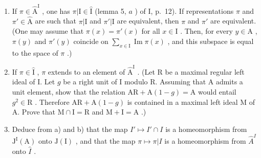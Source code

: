 \begin{enumerate}
\def\labelenumi{\alph{enumi})}
\item
  If \(\pi \in \widehat{\mathrm{A}}^{\mathrm{I}}\) , one has \(\pi | \mathrm{I} \in \widehat{\mathrm{I}}\) (lemma 5, \(a\) ) of I, p.~12). If representations \(\pi\) and \(\pi' \in \widehat{\mathrm{A}}\) are such that \(\pi | \mathrm{I}\) and \(\pi'|\mathrm{I}\) are equivalent, then \(\pi\) and \(\pi'\) are equivalent. (One may assume that \(\pi(x) = \pi'(x)\) for all \(x \in \mathrm{I}\) . Then, for every \(y \in \mathrm{A}\) , \(\pi(y)\) and \(\pi'(y)\) coincide on \(\sum_{x \in \mathrm{I}} \operatorname{Im} \pi(x)\) , and this subspace is equal to the space of \(\pi\) .)
\item
  If \(\pi \in \widehat{\mathrm{I}}\) , \(\pi\) extends to an element of \(\widehat{\mathrm{A}}^{\mathrm{I}}\) . (Let R be a maximal regular left ideal of I. Let \(g\) be a right unit of I modulo R. Assuming that A admits a unit element, show that the relation \(\mathrm{AR} + \mathrm{A}(1 - g) = \mathrm{A}\) would entail \(g^2 \in \mathrm{R}\) . Therefore \(\mathrm{AR} + \mathrm{A}(1 - g)\) is contained in a maximal left ideal M of A. Prove that \(\mathrm{M} \cap \mathrm{I} = \mathrm{R}\) and \(\mathrm{M} + \mathrm{I} = \mathrm{A}\) .)
\item
  Deduce from a) and b) that the map \(I'\mapsto I'\cap I\) is a homeomorphism from \(\mathrm{J}^{\mathrm{I}}(\mathrm{A})\) onto \(\mathrm{J}(\mathrm{I})\) , and that the map \(\pi\mapsto\pi|I\) is a homeomorphism from \(\widehat{A}^{I}\) onto \(\widehat{I}\) .
\end{enumerate}
\relax{}
